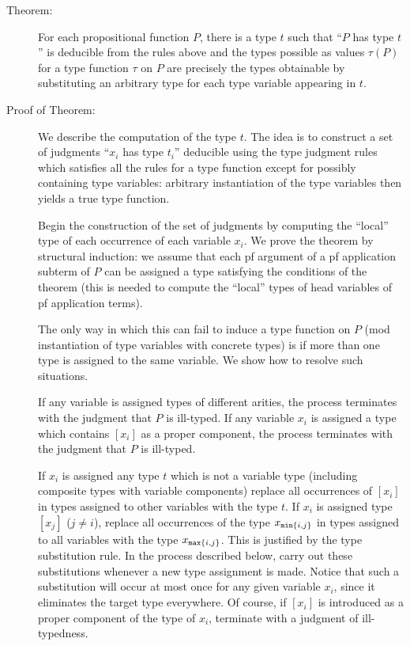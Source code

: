 \documentclass{article}
\begin{document}
\begin{description}

\item[Theorem:] For each propositional function $P$, there is a type
$t$ such that ``$P$ has type $t$'' is deducible from the rules above
and the types possible as values $\tau(P)$ for a type function $\tau$
on $P$ are precisely the types obtainable by substituting an arbitrary
type for each type variable appearing in $t$.

\item[Proof of Theorem:] We describe the computation of the type $t$.
The idea is to construct a set of judgments ``$x_i$ has type $t_i$''
deducible using the type judgment rules which satisfies all the rules
for a type function except for possibly containing type variables:
arbitrary instantiation of the type variables then yields a true type
function.

Begin the construction of the set of judgments by computing the
``local'' type of each occurrence of each variable $x_i$.  We prove
the theorem by structural induction: we assume that each pf argument
of a pf application subterm of $P$ can be assigned a type satisfying
the conditions of the theorem (this is needed to compute the ``local''
types of head variables of pf application terms).

The only way in which this can fail to induce a type function on $P$
(mod instantiation of type variables with concrete types) is if more
than one type is assigned to the same variable.  We show how to
resolve such situations.

If any variable is assigned types of different arities, the process
terminates with the judgment that $P$ is ill-typed.  If any variable
$x_i$ is assigned a type which contains $[x_i]$ as a proper component,
the process terminates with the judgment that $P$ is ill-typed.

If $x_i$ is assigned any type $t$ which is not a variable type
(including composite types with variable components) replace all
occurrences of $[x_i]$ in types assigned to other variables with the
type $t$.  If $x_i$ is assigned type $[x_j]$ ($j \neq i$), replace all
occurrences of the type $x_{{\tt min}\{i,j\}}$ in types assigned to
all variables with the type $x_{{\tt max}\{i,j\}}$.  This is justified
by the type substitution rule.  In the process described below, carry
out these substitutions whenever a new type assignment is made.
Notice that such a substitution will occur at most once for any given
variable $x_i$, since it eliminates the target type everywhere.  Of
course, if $[x_i]$ is introduced as a proper component of the type of
$x_i$, terminate with a judgment of ill-typedness.


\end{description}
\end{document}
